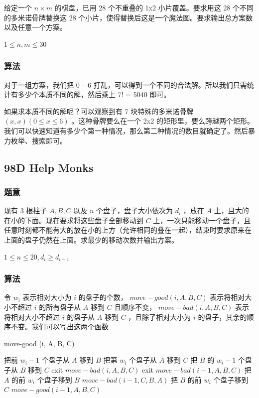 \documentclass[11pt]{article}
\begin{document}
    给定一个 $n \times m$ 的棋盘，已用 28 个不重叠的 1x2 小片覆盖。要求用这 28 个不同的多米诺骨牌替换这 28 个小片，使得替换后这是一个魔法图。要求输出总方案数以及任意一个方案。

    $1 \leq n, m \leq 30$
\subsubsection{算法}
\label{sec-7-2-2}

    对于一组方案，我们把 0 -- 6 打乱，可以得到一个不同的合法解。所以我们只需统计有多少个本质不同的解，然后乘上 7! = 5040 即可。

    如果求本质不同的解呢？可以观察到有 7 块特殊的多米诺骨牌 $(x, x) (0 \leq x \leq 6)$ 。这种骨牌要么在一个 2x2 的矩形里，要么跨越两个矩形。我们可以快速知道有多少个第一种情况，那么第二种情况的数目就确定了。然后暴力枚举、搜索即可。
\subsection{98D   Help Monks}
\label{sec-7-3}
\subsubsection{题意}
\label{sec-7-3-1}

    现有 3 根柱子 $A, B, C$ 以及 $n$ 个盘子，盘子大小依次为 $d_i$ ，放在 $A$ 上，且大的在小的下面。现在要求将这些盘子全部移动到 $C$ 上，一次只能移动一个盘子，且任意时刻都不能有大的放在小的上方（允许相同的叠在一起），结束时要求原来在上面的盘子仍然在上面。求最少的移动次数并输出方案。

    $1 \leq n \leq 20, d_i \geq d_{i - 1}$
\subsubsection{算法}
\label{sec-7-3-2}

    令 $w_i$ 表示相对大小为 $i$ 的盘子的个数， $move-good (i, A, B, C)$ 表示将相对大小不超过 $i$ 的所有盘子从 $A$ 移到 $C$ 且顺序不变， $move-bad(i, A, B, C)$ 表示将相对大小不超过 $i$ 的盘子从 $A$ 移到 $C$ ，且除了相对大小为 $i$ 的盘子，其余的顺序不变。我们可以写出这两个函数

\begin{algorithm}
  \caption{move-good (i, A, B, C)}
  \begin{algorithmic}
      \STATE 把前 $w_i - 1$ 个盘子从 $A$ 移到 $B$
      \STATE 把第 $w_i$ 个盘子从 $A$ 移到 $C$
      \STATE 把 $B$ 的 $w_i- 1$ 个盘子从 $B$ 移到 $C$
      \STATE exit
    \ENDIF
      \STATE $move-bad (i, A, B, C)$
      \STATE exit
    \ENDIF
    \STATE $move-bad (i - 1, A, B, C)$
    \STATE 把 $A$ 的前 $w_i$ 个盘子移到 $B$
    \STATE $move-bad (i - 1, C, B, A)$
    \STATE 把 $B$ 的前 $w_i$ 个盘子移到 $C$
    \STATE $move-good (i - 1, A, B, C)$
  \end{algorithmic}
\end{algorithm}
\end{document}
